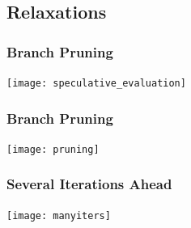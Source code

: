 \documentclass{beamer}
\begin{document}
\subsection{Relaxations}

\begin{frame}
  \frametitle{Branch Pruning}
  \texttt{[image: speculative\_evaluation]}
\end{frame}

\begin{frame}
  \frametitle{Branch Pruning}
  \texttt{[image: pruning]}
\end{frame}

\begin{frame}
  \frametitle{Several Iterations Ahead}
  \texttt{[image: manyiters]}
\end{frame}
\end{document}
